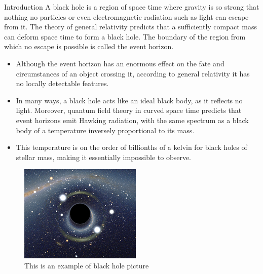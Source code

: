 \documentclass[20pt]{beamer}
\begin{document}
\vspace*{-2cm}
\begin{frame}[t]
\begin{columns}[t]

\begin{column}{0.32\linewidth}

\begin{block}{Introduction}
A black hole is a region of space time where gravity is so strong that nothing no particles or even electromagnetic radiation such as light can escape from it. The theory of general relativity predicts that a sufficiently compact mass can deform space time to form a black hole. The boundary of the region from which no escape is possible is called the event horizon.

\begin{itemize}
 	\item Although the event horizon has an enormous effect on the fate and circumstances of an object crossing it, according to general relativity it has no locally detectable features.
 	
 	\item   In many ways, a black hole acts like an ideal black body, as it reflects no light. Moreover, quantum field theory in curved space time predicts that event horizons emit Hawking radiation, with the same spectrum as a black body of a temperature inversely proportional to its mass.
 	
 	\item  This temperature is on the order of billionths of a kelvin for black holes of stellar mass, making it essentially impossible to observe.
 	
\end{itemize}
 
\begin{figure}
		\includegraphics[width=\linewidth]{blackhole2.png}
		\caption{This is an example of black hole picture}		
\end{figure}


\end{block}
\end{column}
\end{columns}
\end{frame}
\end{document}
